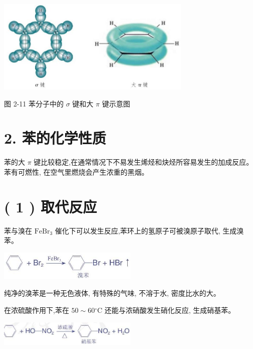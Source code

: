 \documentclass[10pt]{article}
\begin{document}
\begin{center}
\includegraphics[max width=0.7\textwidth]{images/0190efc5-b58a-7c43-bfb0-e0a030df9cfd_49_461225.jpg}
\end{center}

图 2-11 苯分子中的 \(\sigma\) 键和大 \(\pi\) 键示意图

\section*{2. 苯的化学性质}

苯的大 \(\pi\) 键比较稳定,在通常情况下不易发生烯烃和炔烃所容易发生的加成反应。苯有可燃性, 在空气里燃烧会产生浓重的黑烟。

\section*{( 1 ) 取代反应}

苯与溴在 \({\mathrm{{FeBr}}}_{3}\) 催化下可以发生反应,苯环上的氢原子可被溴原子取代, 生成溴苯。

\begin{center}
\includegraphics[max width=0.5\textwidth]{images/0190efc5-b58a-7c43-bfb0-e0a030df9cfd_49_878182.jpg}
\end{center}

纯净的溴苯是一种无色液体, 有特殊的气味, 不溶于水, 密度比水的大。

在浓硫酸作用下,苯在 \({50} \sim {60}{}^{ \circ }\mathrm{C}\) 还能与浓硝酸发生硝化反应, 生成硝基苯。

\begin{center}
\includegraphics[max width=0.5\textwidth]{images/0190efc5-b58a-7c43-bfb0-e0a030df9cfd_49_493492.jpg}
\end{center}
\end{document}
